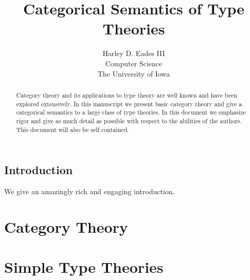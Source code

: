 \documentclass{report}
\begin{document}

\newtheorem{thm}{Theorem}
\newtheorem{lemma}[thm]{Lemma}

\newtheorem{corollary}[thm]{Corollary}
\newtheorem{definition}[thm]{Definition}
\newtheorem{remark}[thm]{Remark}
\newtheorem{proposition}[thm]{Proposition}
\newtheorem{notn}[thm]{Notation}
\newtheorem{observation}[thm]{Observation}

\newcommand{\interp}[1]{[\negthinspace[#1]\negthinspace]}
\newcommand{\normto}[0]{\rightsquigarrow^{!}}
\newcommand{\case}[4]{\text{case}\ #1\ \text{of}\ #2\text{.}#3\text{,}#2\text{.}#4}
\newcommand{\join}[0]{\downarrow}

\title{Categorical Semantics of Type Theories}
\author{Harley D. Eades III \\
Computer Science\\
The University of Iowa}

\maketitle

\begin{abstract}
  Category theory and its applications to type theory are well known and 
  have been explored extensively.  In this manuscript we present basic category
  theory and give a categorical semantics to a large class of type theories.
  In this document we emphasize rigor and give as much detail as possible
  with respect to the abilities of the authors.  This document will also be
  self contained.
\end{abstract}

\tableofcontents

\listoffigures

\section{Introduction}
\label{sec:introduction}
We give an amazingly rich and engaging introduction.

\chapter{Category Theory}
\label{chap:cat_theory}


\chapter{Simple Type Theories}
\label{chap:simple_types}



\end{document}
